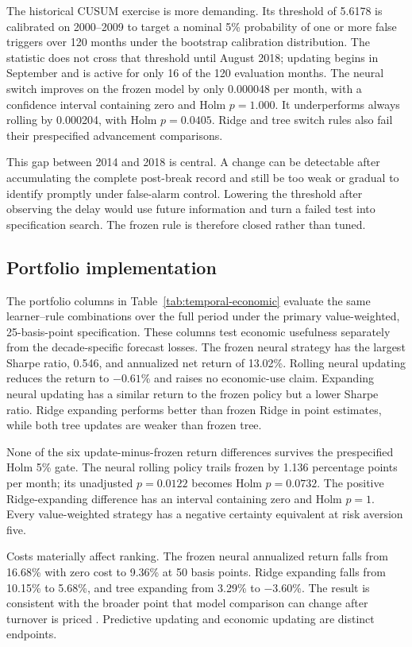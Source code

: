 The historical CUSUM exercise is more demanding. Its threshold of 5.6178 is calibrated on 2000--2009 to target a nominal 5\% probability of one or more false triggers over 120 months under the bootstrap calibration distribution. The statistic does not cross that threshold until August 2018; updating begins in September and is active for only 16 of the 120 evaluation months. The neural switch improves on the frozen model by only 0.000048 per month, with a confidence interval containing zero and Holm $p=1.000$. It underperforms always rolling by 0.000204, with Holm $p=0.0405$. Ridge and tree switch rules also fail their prespecified advancement comparisons.

This gap between 2014 and 2018 is central. A change can be detectable after accumulating the complete post-break record and still be too weak or gradual to identify promptly under false-alarm control. Lowering the threshold after observing the delay would use future information and turn a failed test into specification search. The frozen rule is therefore closed rather than tuned.

\subsection{Portfolio implementation}

The portfolio columns in Table~\ref{tab:temporal-economic} evaluate the same learner--rule combinations over the full period under the primary value-weighted, 25-basis-point specification. These columns test economic usefulness separately from the decade-specific forecast losses. The frozen neural strategy has the largest Sharpe ratio, 0.546, and annualized net return of 13.02\%. Rolling neural updating reduces the return to $-0.61$\% and raises no economic-use claim. Expanding neural updating has a similar return to the frozen policy but a lower Sharpe ratio. Ridge expanding performs better than frozen Ridge in point estimates, while both tree updates are weaker than frozen tree.

None of the six update-minus-frozen return differences survives the prespecified Holm 5\% gate. The neural rolling policy trails frozen by 1.136 percentage points per month; its unadjusted $p=0.0122$ becomes Holm $p=0.0732$. The positive Ridge-expanding difference has an interval containing zero and Holm $p=1$. Every value-weighted strategy has a negative certainty equivalent at risk aversion five.

Costs materially affect ranking. The frozen neural annualized return falls from 16.68\% with zero cost to 9.36\% at 50 basis points. Ridge expanding falls from 10.15\% to 5.68\%, and tree expanding from 3.29\% to $-3.60$\%. The result is consistent with the broader point that model comparison can change after turnover is priced \citep{detzel2023costs}. Predictive updating and economic updating are distinct endpoints.

